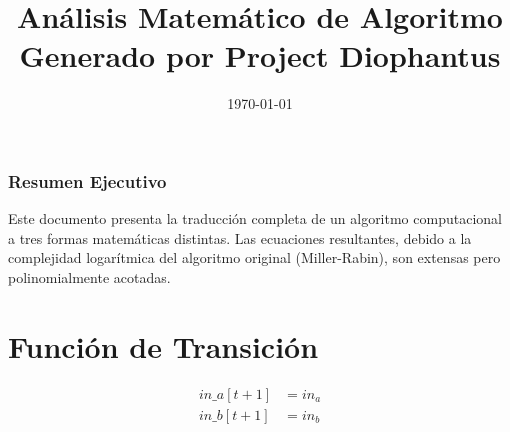 \documentclass[10pt, a4paper]{article}
\title{Análisis Matemático de Algoritmo \\ \large Generado por Project Diophantus}
\author{}
\date{\today}
\begin{document}
\maketitle
\section*{Resumen Ejecutivo}
Este documento presenta la traducción completa de un algoritmo computacional a tres formas matemáticas distintas.
Las ecuaciones resultantes, debido a la complejidad logarítmica del algoritmo original (Miller-Rabin), son extensas pero polinomialmente acotadas.
\part{Función de Transición}
\begin{align*}
in\_a[t+1] &= in_a \\
in\_b[t+1] &= in_b \\

\end{align*}
\end{document}
